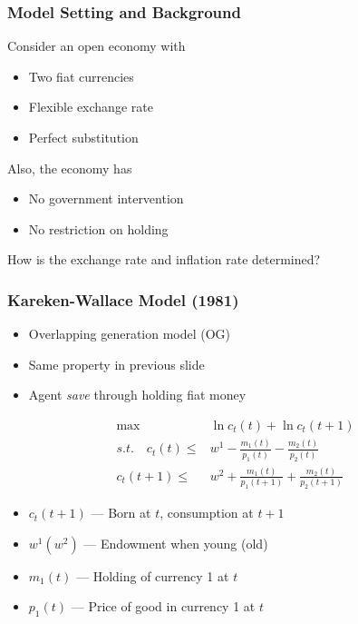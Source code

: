 \begin{frame}
    \frametitle{Model Setting and Background}
    Consider an open economy with 
    \begin{itemize}
        \item Two fiat currencies
        \item Flexible exchange rate
        \item Perfect substitution
    \end{itemize}

    \vfill 

    Also, the economy has 

    \begin{itemize}
        \item No government intervention
        \item No restriction on holding
    \end{itemize}

    \vfill

    How is the exchange rate and inflation rate determined?
    

\end{frame}

\begin{frame}
    \frametitle{Kareken-Wallace Model (1981)}
    \begin{itemize}
        \item Overlapping generation model (OG)
        \item Same property in previous slide
        \item Agent \emph{save} through holding fiat money
    \end{itemize}

    \begin{equation*}
        \begin{aligned}
            \max \quad & \ln c_t(t) + \ln c_t(t+1) \\
            s.t. \quad c_t(t) \le& w^1 - \frac{m_1(t)}{p_1(t)}- \frac{m_2(t)}{p_2(t)} \\ 
            c_t(t+1) \le& w^2 + \frac{m_1(t)}{p_1(t+1)}+ \frac{m_2(t)}{p_2(t+1)}
        \end{aligned}
    \end{equation*}

    \begin{itemize}
        \item $c_t(t+1)$ --- Born at $t$, consumption at $t+1$
        \item $w^1(w^2)$ --- Endowment when young (old)
        \item $m_1(t)$ --- Holding of currency 1 at $t$
        \item $p_1(t)$ --- Price of good in currency 1 at $t$
    \end{itemize}

\end{frame}

